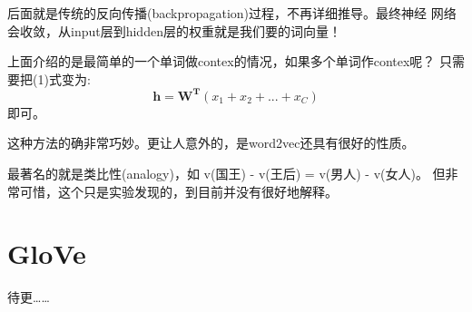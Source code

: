 \documentclass{article}
\begin{document}
        后面就是传统的反向传播(backpropagation)过程，不再详细推导。最终神经
        网络会收敛，从input层到hidden层的权重就是我们要的词向量！

        上面介绍的是最简单的一个单词做contex的情况，如果多个单词作contex呢？
        只需要把(1)式变为:
        \begin{equation}
            \mathbf{h} = \mathbf{W^{T}}(x_1+x_2+...+x_C)
        \end{equation}
        即可。

        这种方法的确非常巧妙。更让人意外的，是word2vec还具有很好的性质。

        最著名的就是类比性(analogy)，如 v(国王) - v(王后) = v(男人) - v(女人)。
        但非常可惜，这个只是实验发现的，到目前并没有很好地解释。


        \section{GloVe}
            待更……






        

        

    
\end{document}
